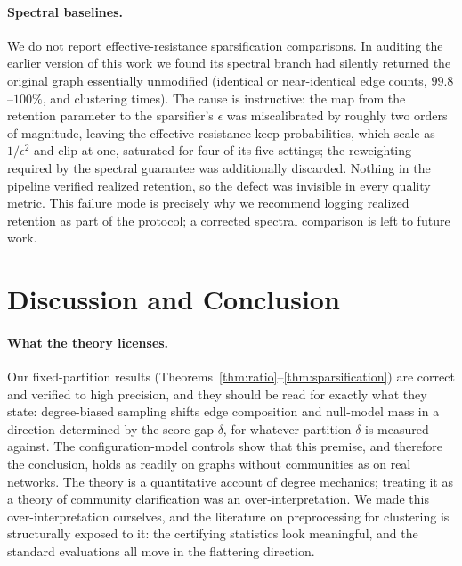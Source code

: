 \documentclass[10pt,journal,compsoc]{IEEEtran}
\begin{document}
\paragraph{Spectral baselines.}
We do not report effective-resistance sparsification comparisons.
In auditing the earlier version of this work we found its spectral branch had silently returned the original graph essentially unmodified (identical or near-identical edge counts, $99.8$--$100\%$, and clustering times). The cause is instructive: the map from the retention parameter to the sparsifier's $\epsilon$ was miscalibrated by roughly two orders of magnitude, leaving the effective-resistance keep-probabilities, which scale as $1/\epsilon^2$ and clip at one, saturated for four of its five settings; the reweighting required by the spectral guarantee was additionally discarded. Nothing in the pipeline verified realized retention, so the defect was invisible in every quality metric. This failure mode is precisely why we recommend logging realized retention as part of the protocol; a corrected spectral comparison is left to future work.


\section{Discussion and Conclusion}
\label{sec:discussion}

\paragraph{What the theory licenses.}
Our fixed-partition results (Theorems~\ref{thm:ratio}--\ref{thm:sparsification}) are correct and verified to high precision, and they should be read for exactly what they state: degree-biased sampling shifts edge composition and null-model mass in a direction determined by the score gap $\delta$, for whatever partition $\delta$ is measured against.
The configuration-model controls show that this premise, and therefore the conclusion, holds as readily on graphs without communities as on real networks.
The theory is a quantitative account of degree mechanics; treating it as a theory of community clarification was an over-interpretation. We made this over-interpretation ourselves, and the literature on preprocessing for clustering is structurally exposed to it: the certifying statistics look meaningful, and the standard evaluations all move in the flattering direction.
\end{document}

